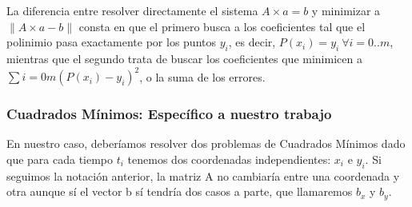   La diferencia entre resolver directamente el sistema $A \times a = b$ y minimizar a $\| A \times a
  - b \|$ consta en que el primero busca a los coeficientes tal que el polinimio pasa exactamente
  por los puntos $y_i$, es decir, $P(x_i)=y_i \ \forall i= 0..m$, mientras que el segundo trata de
  buscar los coeficientes que minimicen a $\sum{i=0}{m} (P(x_i)-y_i)^2$, o la suma de los errores.


%
%
%
%
%

\subsubsection{Cuadrados Mínimos: Específico a nuestro trabajo}
En nuestro caso, deberíamos resolver dos problemas de Cuadrados Mínimos dado que para cada tiempo
$t_i$ tenemos dos coordenadas independientes: $x_i$ e $y_i$. Si seguimos la notación anterior, la
matriz A no cambiaría entre una coordenada y otra aunque sí el vector b sí tendría dos casos a
parte, que llamaremos $b_x$ y $b_y$.

